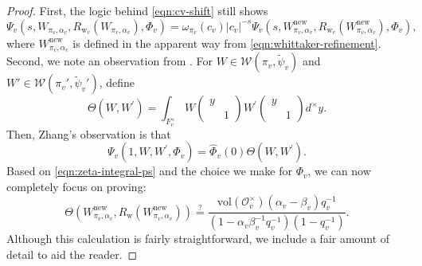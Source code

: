 \documentclass[10pt, twoside]{amsart}
\theoremstyle{plain}
\theoremstyle{definition}
\theoremstyle{remark}
\numberwithin{equation}{subsection}
\def\new{\mathrm{new}}
\def\scro{\mathscr O}
\def\calw{\mathcal W}
\def\scro{\mathscr O}
\begin{document}
\begin{proof}
First, the logic behind \eqref{eqn:cv-shift} still shows
\begin{equation}\label{eqn:zeta-integral-ps}
\Psi_v(s,W_{\pi_v,\alpha_v},R_{{ \boldsymbol{\mathrm{w}}}_v}(W_{\pi_v,\alpha_v}),\Phi_v) = \omega_{\pi_v}(c_v)|c_v|^{-s}\Psi_v(s,W_{\pi_v,\alpha_v}^{\new}, R_{{ \boldsymbol{\mathrm{w}}}_v}(W_{\pi_v,\alpha_v}^{\new}),\Phi_v),
\end{equation}
where $W_{\pi_v,\alpha_v}^{\new}$ is defined in the apparent way from \eqref{eqn:whittaker-refinement}. Second, we note an observation from \cite[\S 3.1]{Zhang}.  For $W \in \calw(\pi_v,\widetilde \psi_v)$ and $W' \in \calw(\pi_v',\widetilde\psi_v')$, define
$$
\Theta (W, W^\prime) = \int_{F_v^\times} W \begin{pmatrix} y & \\ & 1 \end{pmatrix} W^\prime \begin{pmatrix} y & \\ & 1 \end{pmatrix} d^\times y.
$$
Then, Zhang's observation is that
$$
\Psi_v (1, W, W^\prime, \Phi_v) = \widehat \Phi_v (0) \Theta (W, W^\prime).
$$ 
Based on \eqref{eqn:zeta-integral-ps} and the choice we make for $\Phi_v$, we can now completely focus on proving:
\begin{equation}\label{eqn:padic-goal-to-show}
\Theta (W_{\pi_v,\alpha_v}^{\new}, R_{ \boldsymbol{\mathrm{w}}} (W_{\pi_v,\alpha_v}^{\new})) \overset{?}{=} \frac{\mathrm{vol}(\scro_v^\times)(\alpha_v-\beta_v)q_v^{-1}}{(1-\alpha_v\beta_v^{-1}q_v^{-1})(1-q_v^{-1})}.
\end{equation}
Although this calculation is fairly straightforward, we include a fair amount of detail to aid the reader.


\end{proof}
\end{document}
